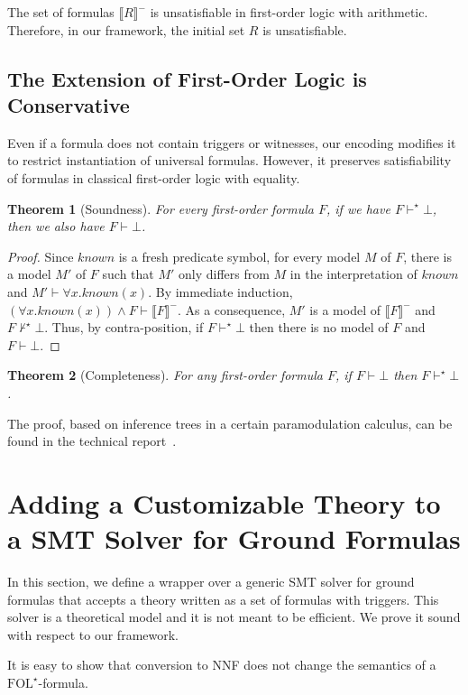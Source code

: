 \documentclass[]{easychair}
\newcommand{\Fm}[1]{\llb #1 \rrb^-}
\newcommand{\K}{\mathit{known}}
\newcommand{\FOLT}{\mathrm{FOL}^\star}
\newcommand{\iFOLT}{\vdash^\star}
\newcommand{\iFOL}{\vdash}
\newcommand{\llb}{\llbracket} \newcommand{\rrb}{\rrbracket}
\newcommand{\beforesec}{\vspace{0cm}}
\newcommand{\aftersec}{\vspace{0cm}}
\newcommand{\beforesub}{\vspace{0cm}}
\newcommand{\aftersub}{\vspace{0cm}}
\newtheorem{theorem}{Theorem}[section]
\begin{document}
The set of formulas $\Fm{R}$ is unsatisfiable in first-order logic with
arithmetic. Therefore, in our framework, the initial set $R$ is
unsatisfiable.

\beforesub
\subsection{The Extension of First-Order Logic is Conservative}
\aftersub

Even if a formula does not contain triggers or witnesses,
our encoding modifies it to restrict instantiation of universal formulas.
However, it preserves satisfiability
of formulas in classical first-order logic with equality.

\begin{theorem}[Soundness]
For every first-order formula $F$, if
we have $F\iFOLT\bot$, then we also have $F\iFOL\bot$.
\end{theorem}
\begin{proof}
 Since $\K$ is a fresh predicate symbol, for every model $M$ of $F$, there is a
model $M'$ of $F$ such that $M'$ only differs from $M$ in the interpretation of
$\K$ and $M'\iFOL\forall x.\K(x)$. By immediate induction, $(\forall
x.\K(x))\land
F\iFOL\Fm{F}$. As a consequence, $M'$ is a model of $\Fm{F}$ and
$F\not\iFOLT\bot$. Thus, by contra-position, if $F\iFOLT\bot$ then there is no
model of $F$ and $F\iFOL\bot$.
\end{proof}

\begin{theorem}[Completeness]\label{thm-folt}
For any first-order formula $F$, if $F\iFOL\bot$ then $F\iFOLT\bot$.
\end{theorem}

The proof, based on inference trees in a certain paramodulation calculus, can
be found in the technical report~\cite{tech-report}.

\beforesec
\section{\label{prover}Adding a Customizable Theory to a SMT Solver for Ground
Formulas}
\aftersec

In this section, we define a wrapper over a generic SMT solver for ground
formulas that accepts a theory written as a set of formulas with triggers. This
solver is a theoretical model
and it is not meant to be efficient. We prove it sound with respect to our
framework.

It is easy to
show that conversion to NNF does not change the semantics of a $\FOLT$-formula.
\end{document}
